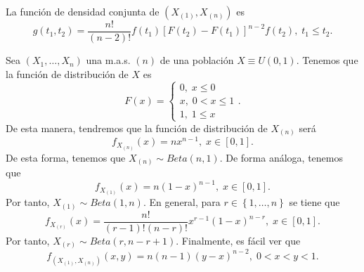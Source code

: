 \begin{colorary}
La función de densidad conjunta de $\displaystyle \left(X_{\left(1\right)}, X_{\left(n\right)}\right) $ es
\[g\left(t_{1}, t_{2}\right)=\frac{n!}{\left(n-2\right)!}f\left(t_{1}\right)\left[F\left(t_{2}\right)-F\left(t_{1}\right)\right] ^{n-2}f\left(t_{2}\right), \; t_{1}\leq t_{2} .\]
\end{colorary}
\begin{eg}
	Sea $\displaystyle \left(X_{1}, \ldots, X_{n}\right) $ una m.a.s. $\displaystyle \left(n\right) $ de una población $\displaystyle X \equiv U\left(0,1\right) $. Tenemos que la función de distribución de $\displaystyle X $ es
	\[F\left(x\right)=
	\begin{cases}
	0, \; x \leq 0 \\
	x, \; 0 < x \leq 1 \\
	1, \; 1 \leq x
	\end{cases}
	.\]
De esta manera, tendremos que la función de distribución de $\displaystyle X_{\left(n\right)} $ será
\[f_{X_{\left(n\right)}}\left(x\right)=nx^{n-1}, \; x \in \left[0,1\right]  .\]
De esta forma, tenemos que $\displaystyle X_{\left(n\right)}\sim Beta\left(n,1\right) $. De forma análoga, tenemos que 
\[f_{X_{\left(1\right)}}\left(x\right)=n\left(1-x\right)^{n-1}, \; x \in \left[0,1\right]  .\]
Por tanto, $\displaystyle X_{\left(1\right)}\sim Beta\left(1,n\right) $. En general, para $\displaystyle r \in \left\{ 1, \ldots, n\right\}  $ se tiene que
\[f_{X_{\left(r\right)}}\left(x\right)=\frac{n!}{\left(r-1\right)!\left(n-r\right)!}x^{r-1}\left(1-x\right)^{n-r} , \; x \in \left[0,1\right] .\]
Por tanto, $\displaystyle X_{\left(r\right)}\sim Beta\left(r, n-r+1\right) $. Finalmente, es fácil ver que
\[f_{\left(X_{\left(1\right)}, X_{\left(n\right)}\right)} \left(x,y\right)=n\left(n-1\right)\left(y-x\right)^{n-2}, \; 0 < x < y < 1 .\]
\end{eg}
